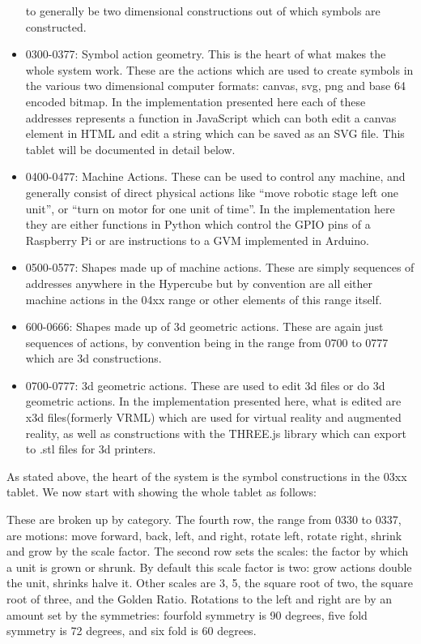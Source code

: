 \begin{itemize}
  to generally be two dimensional constructions out of which symbols are
  constructed.\\
\item
  0300-0377: Symbol action geometry. This is the heart of what makes the
  whole system work. These are the actions which are used to create
  symbols in the various two dimensional computer formats: canvas, svg,
  png and base 64 encoded bitmap. In the implementation presented here
  each of these addresses represents a function in JavaScript which can
  both edit a canvas element in HTML and edit a string which can be
  saved as an SVG file. This tablet will be documented in detail below.
\item
  0400-0477: Machine Actions. These can be used to control any machine,
  and generally consist of direct physical actions like ``move robotic
  stage left one unit'', or ``turn on motor for one unit of time''. In
  the implementation here they are either functions in Python which
  control the GPIO pins of a Raspberry Pi or are instructions to a GVM
  implemented in Arduino.\\
\item
  0500-0577: Shapes made up of machine actions. These are simply
  sequences of addresses anywhere in the Hypercube but by convention are
  all either machine actions in the 04xx range or other elements of this
  range itself.
\item
  600-0666: Shapes made up of 3d geometric actions. These are again just
  sequences of actions, by convention being in the range from 0700 to
  0777 which are 3d constructions.
\item
  0700-0777: 3d geometric actions. These are used to edit 3d files or do
  3d geometric actions. In the implementation presented here, what is
  edited are x3d files(formerly VRML) which are used for virtual reality
  and augmented reality, as well as constructions with the THREE.js
  library which can export to .stl files for 3d printers.
\end{itemize}

As stated above, the heart of the system is the symbol constructions in
the 03xx tablet. We now start with showing the whole tablet as follows:


These are broken up by category. The fourth row, the range from 0330 to
0337, are motions: move forward, back, left, and right, rotate left,
rotate right, shrink and grow by the scale factor. The second row sets
the scales: the factor by which a unit is grown or shrunk. By default
this scale factor is two: grow actions double the unit, shrinks halve
it. Other scales are 3, 5, the square root of two, the square root of
three, and the Golden Ratio. Rotations to the left and right are by an
amount set by the symmetries: fourfold symmetry is 90 degrees, five fold
symmetry is 72 degrees, and six fold is 60 degrees.

